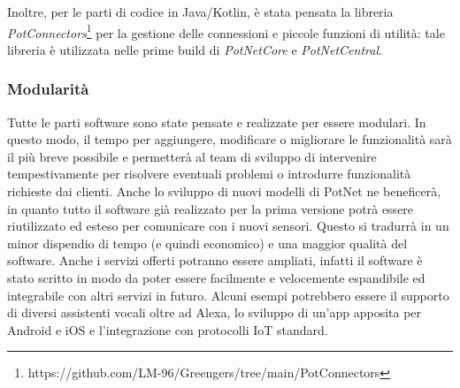 Inoltre, per le parti di codice in Java/Kotlin, è stata pensata la libreria \textit{PotConnectors}\footnote{https://github.com/LM-96/Greengers/tree/main/PotConnectors} per la gestione delle connessioni e piccole funzioni di utilità: tale libreria è utilizzata nelle prime build di \textit{PotNetCore} e \textit{PotNetCentral}.

\subsubsection{Modularità}

Tutte le parti software sono state pensate e realizzate per essere modulari. In questo modo, il tempo per aggiungere, modificare o migliorare le funzionalità sarà il più breve possibile e permetterà al team di sviluppo di intervenire tempestivamente per risolvere eventuali problemi o introdurre funzionalità richieste dai clienti.
\newline Anche lo sviluppo di nuovi modelli di PotNet ne beneficerà, in quanto tutto il software già realizzato per la prima versione potrà essere riutilizzato ed esteso per comunicare con i nuovi sensori. Questo si tradurrà in un minor dispendio di tempo (e quindi economico) e una maggior qualità del software.
\newline\newline Anche i servizi offerti potranno essere ampliati, infatti il software è stato scritto in modo da poter essere facilmente e velocemente espandibile ed integrabile con altri servizi in futuro. Alcuni esempi potrebbero essere il supporto di diversi assistenti vocali oltre ad Alexa, lo sviluppo di un'app apposita per Android e iOS e l'integrazione con protocolli IoT standard.